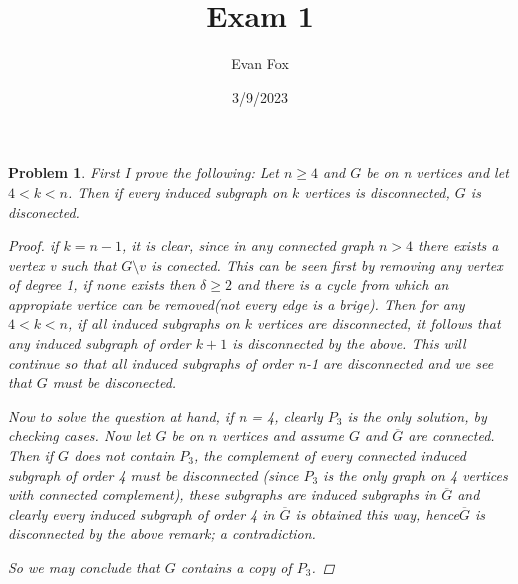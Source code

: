 \documentclass{article}
\title{Exam 1}
\author{Evan Fox}
\date{3/9/2023}
\newtheorem{prb}{Problem}
\begin{document}
 
\maketitle

\begin{prb} 
First I prove the following:
Let $n \geq 4$
and $G$ be on n vertices and let $4< k < n$. Then if every induced subgraph on $k$ vertices is disconnected, $G$ is disconected.
	\begin{proof} 

if $k = n-1$, it is clear, since in any connected graph $n > 4$ there exists a vertex v such that $G \setminus v$ is conected. This can be seen first by removing any vertex of degree 1, if none exists then $\delta \geq 2$ and there is a cycle from which an appropiate vertice can be removed(not every edge is a brige). Then for any $4 < k< n$, if all induced subgraphs on $k$ vertices are disconnected, it follows that any induced subgraph of order $k+1$ is disconnected 
by the above. This will continue so that all induced subgraphs of order n-1 are disconnected and we see that $G$ must be disconected. 


Now to solve the question at hand, if n = 4, clearly $P_3$ is the only solution, by checking cases. 
Now let $G$ be on $n$ vertices and assume $G$ and $\overline{G}$ are connected. Then if $G$ does not contain $P_3$, the complement of 
every connected induced subgraph of order 4 must be disconnected (since $P_3$ is the only graph on 4 vertices with connected complement), these subgraphs are induced subgraphs in $\overline{G}$ and 
clearly every induced subgraph of order 4 in $\overline{G}$ is obtained this way, hence$ \overline{G}$ is disconnected by the above remark; a contradiction. 

So we may conclude that $G$ contains a copy of $P_3$.
\end{proof}
\end{prb} 
\end{document}
